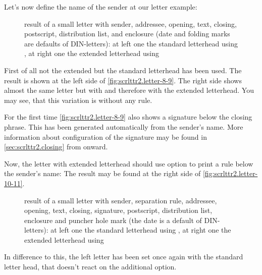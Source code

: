 \begin{Example}
  Let's now define the name of the sender at our letter example:
  \begin{figure}
    \centering
    \quad
    \caption[{Example: letter with sender, addressee, opening, text, closing,
      postscript, distribution list, and enclosure}]
    {result of a small letter with sender, addressee, opening, text, closing,
      postscript, distribution list, and enclosure (date and folding marks are
      defaults of DIN-letters): at left one the standard letterhead using
      , at right one the
      extended letterhead using }
    \label{fig:scrlttr2.letter-8-9}
  \end{figure}
  First of all not the extended but the standard letterhead has been used. The
  result is shown at the left side of \autoref{fig:scrlttr2.letter-8-9}. The
  right side shows almost the same letter but with
   and therefore with the extended
  letterhead. You may see, that this variation is without any rule.

  For the first time \autoref{fig:scrlttr2.letter-8-9} also shows a signature
  below the closing phrase. This has been generated automatically from the
  sender's name. More information about configuration of the signature may be
  found in  \autoref{sec:scrlttr2.closing} from
   onward.

  Now, the letter with extended letterhead should use option 
  to print a rule below the sender's name:%
  The result may be found at the right side of
  \autoref{fig:scrlttr2.letter-10-11}.
  \begin{figure}
    \centering
    \quad
    \caption[{Example: letter with sender, separation rule, addressee,
      opening, text, closing, signature, postscript, distribution list,
      enclosure, and puncher hole mark}]
    {result of a small letter with sender, separation rule, addressee,
      opening, text, closing, signature, postscript, distribution list,
      enclosure and puncher hole mark (the date is a default of DIN-letters):
      at left one the standard letterhead using
      , at right one the extended letterhead
      using }
    \label{fig:scrlttr2.letter-10-11}
  \end{figure}
  In difference to this, the left letter has been set once again with the
  standard letter head, that doesn't react on the additional option.
\end{Example}

